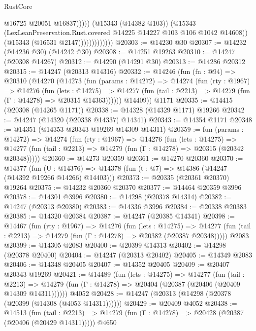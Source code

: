 \begin{lexlean}{RustCore}
\begin{coremodule}
                                    @16725
                                    @20051
                                    @16837)))))
                          (@15343 (@14382 @103))
                          (@15343
                            (LexLeanPreservation.Rust.covered @14225 @14227 @103 @106 @1042 @14608))
                          (@15343 (@16531 @2147)))))))))))))
@20303 := @14230 @30
@20307 := @14232 (@14236 @30) (@14242 @30)
@20308 := @14251 @19263
@20310 := @14247 (@20308 @14267)
@20312 := @14290 (@14291 @30)
@20313 := @14286 @20312
@20315 := @14247 (@20313 @14316)
@20332 := @14246
    (fun (fn : @94) =>
    @20310
      (@14270
        (@14273
          (fun (params : @14272) =>
          @14274
            (fun (rty : @1967) =>
            @14276
              (fun (lets : @14275) =>
              @14277 (fun (tail : @2213) => @14279 (fun (Γ : @14278) => @20315 @14363))))))
        @14409))
    @1171
@20335 := @14415 (@20308 (@14265 @1171))
@20338 := @14328 (@14329 @1171) @19266
@20342 := @14247 (@14320 (@20338 @14337) @14341)
@20343 := @14354 @1171
@20348 := @14351 (@14353 @20343 @19269 @14309 @14311)
@20359 := fun (params : @14272) =>
  @14274
    (fun (rty : @1967) =>
    @14276
      (fun (lets : @14275) =>
      @14277 (fun (tail : @2213) => @14279 (fun (Γ : @14278) => @20315 (@20342 @20348)))))
@20360 := @14273 @20359
@20361 := @14270 @20360
@20370 := @14377
    (fun (U : @14376) => @14378 (fun (t : @7) => @14386 (@14247 (@14392 @19266 @14266) @14403)))
@20373 := @20335 (@20361 @20370) @19264
@20375 := @14232 @20360 @20370
@20377 := @14464 @20359 @3996
@20378 := @14301 @3996
@20380 := @14298 (@20378 @14314)
@20382 := @14247 (@20313 @20380)
@20383 := @14336 @3996
@20384 := @20338 @20383
@20385 := @14320 @20384
@20387 := @14247 (@20385 @14341)
@20398 := @14467
    (fun (rty : @1967) =>
    @14276
      (fun (lets : @14275) =>
      @14277 (fun (tail : @2213) => @14279 (fun (Γ : @14278) => @20382 (@20387 @20348)))))
    @2083
@20399 := @14305 @2083
@20400 := @20399 @14313
@20402 := @14298 (@20378 @20400)
@20404 := @14247 (@20313 @20402)
@20405 := @14349 @2083
@20406 := @14348 @20405
@20407 := @14352 @20405
@20409 := @20407 @20343 @19269
@20421 := @14489
    (fun (lets : @14275) =>
    @14277
      (fun (tail : @2213) =>
      @14279 (fun (Γ : @14278) => @20404 (@20387 (@20406 (@20409 @14309 @14311))))))
    @4052
@20428 := @14247 (@20313 (@14298 (@20378 (@20399 (@14308 (@4053 @14311))))))
@20429 := @20409 @4052
@20438 := @14513
    (fun (tail : @2213) => @14279 (fun (Γ : @14278) => @20428 (@20387 (@20406 (@20429 @14311)))))
    @4650

\end{coremodule}
\end{lexlean}
